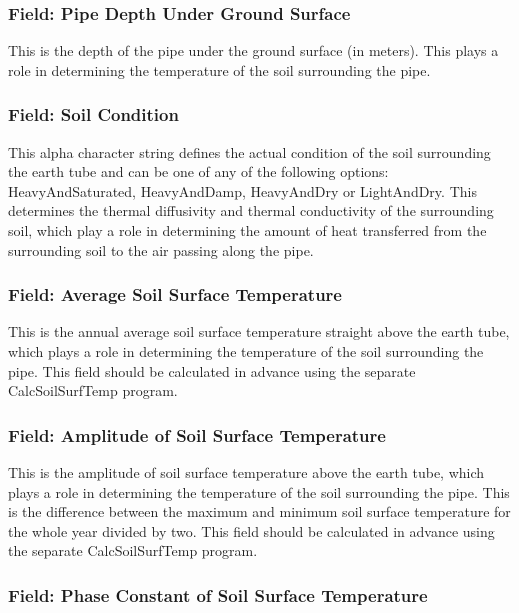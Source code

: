 \subsubsection{Field: Pipe Depth Under Ground Surface}\label{field-pipe-depth-under-ground-surface}

This is the depth of the pipe under the ground surface (in meters). This plays a role in determining the temperature of the soil surrounding the pipe.

\subsubsection{Field: Soil Condition}\label{field-soil-condition}

This alpha character string defines the actual condition of the soil surrounding the earth tube and can be one of any of the following options: HeavyAndSaturated, HeavyAndDamp, HeavyAndDry or LightAndDry. This determines the thermal diffusivity and thermal conductivity of the surrounding soil, which play a role in determining the amount of heat transferred from the surrounding soil to the air passing along the pipe.

\subsubsection{Field: Average Soil Surface Temperature}\label{field-average-soil-surface-temperature}

This is the annual average soil surface temperature straight above the earth tube, which plays a role in determining the temperature of the soil surrounding the pipe. This field should be calculated in advance using the separate CalcSoilSurfTemp program.

\subsubsection{Field: Amplitude of Soil Surface Temperature}\label{field-amplitude-of-soil-surface-temperature}

This is the amplitude of soil surface temperature above the earth tube, which plays a role in determining the temperature of the soil surrounding the pipe. This is the difference between the maximum and minimum soil surface temperature for the whole year divided by two. This field should be calculated in advance using the separate CalcSoilSurfTemp program.

\subsubsection{Field: Phase Constant of Soil Surface Temperature}\label{field-phase-constant-of-soil-surface-temperature}

